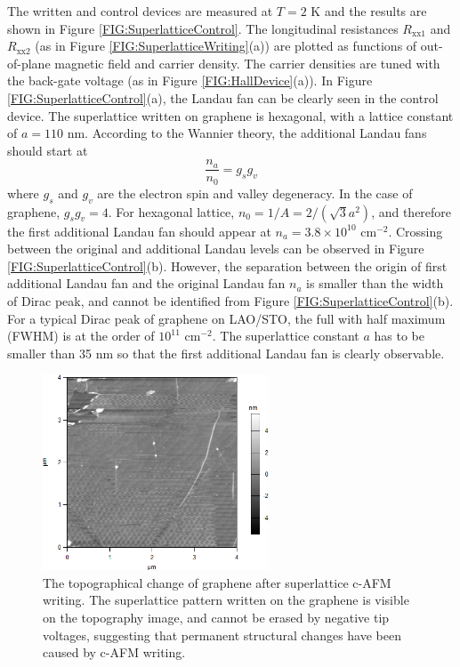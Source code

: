 \documentclass[pdflatex, sectionletters, 12pt]{pittetd}    %
\begin{document}
The written and control devices are measured at $T = 2$ K and the results are shown in Figure \ref{FIG:SuperlatticeControl}. The longitudinal resistances $R_\mathrm{xx1}$ and $R_\mathrm{xx2}$ (as in Figure \ref{FIG:SuperlatticeWriting}(a)) are plotted as functions of out-of-plane magnetic field and carrier density. The carrier densities are tuned with the back-gate voltage (as in Figure \ref{FIG:HallDevice}(a)). In Figure \ref{FIG:SuperlatticeControl}(a), the Landau fan can be clearly seen in the control device. The superlattice written on graphene is hexagonal, with a lattice constant of $a = 110$ nm. According to the Wannier theory, the additional Landau fans should start at\cite{dean2013hofstadter} 
$$
\frac{n_a}{n_0} = g_s g_v
$$
where $g_s$ and $g_v$ are the electron spin and valley degeneracy. In the case of graphene, $g_s g_v = 4$. For hexagonal lattice, $n_0 = 1/A = 2 / (\sqrt{3} a^2)$, and therefore the first additional Landau fan should appear at $n_a = 3.8 \times 10^{10}$ cm$^{-2}$. Crossing between the original and additional Landau levels can be observed in Figure \ref{FIG:SuperlatticeControl}(b). However, the separation between the origin of first additional Landau fan and the original Landau fan $n_a$ is smaller than the width of Dirac peak, and cannot be identified from Figure \ref{FIG:SuperlatticeControl}(b). For a typical Dirac peak of graphene on LAO/STO, the full with half maximum (FWHM) is at the order of $10^{11}$ cm$^{-2}$. The superlattice constant $a$ has to be smaller than 35 nm so that the first additional Landau fan is clearly observable.
\\

\begin{figure}[h!]
	\centering
	\includegraphics[width=0.6\textwidth]{Drawing/SuperlatticeDamage.png}
	\caption{The topographical change of graphene after superlattice c-AFM writing. The superlattice pattern written on the graphene is visible on the topography image, and cannot be erased by negative tip voltages, suggesting that permanent structural changes have been caused by c-AFM writing.}
	\label{FIG:SuperlatticeDamage}
\end{figure}
\end{document}
